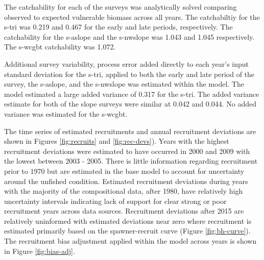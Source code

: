 \documentclass[11pt,
  english,
  a4paper,
]{article}
\begin{document}
\leavevmode\tagmcend\tagstructend\par


The catchability for each of the surveys was analytically solved comparing observed to expected vulnerable biomass across all years. The catchabiltiy for the \gls{s-tri} was 0.219 and 0.467 for the early and late periods, respectively. The catchability for the \gls{s-aslope} and the \gls{s-nwslope} was 1.043 and 1.045 respectively. The \gls{s-wcgbt} catchability was 1.072.

\leavevmode\tagmcend\tagstructend\par


Additional survey variability, process error added directly to each year's input standard deviation for the \gls{s-tri}, applied to both the early and late period of the survey, the \gls{s-aslope}, and the \gls{s-nwslope} was estimated within the model. The model estimated a large added variance of 0.317 for the \gls{s-tri}. The added variance estimate for both of the slope surveys were similar at 0.042 and 0.044. No added variance was estimated for the \gls{s-wcgbt}.

\leavevmode\tagmcend\tagstructend\par


The time series of estimated recruitments and annual recruitment deviations are shown in Figures \ref{fig:recruits} and \ref{fig:rec-devs}). Years with the highest recruitment deviations were estimated to have occurred in 2000 and 2009 with the lowest between 2003 - 2005. There is little information regarding recruitment prior to 1970 but are estimated in the base model to account for uncertainty around the unfished condition. Estimated recruitment deviations during years with the majority of the compositional data, after 1980, have relatively high uncertainty intervals indicating lack of support for clear strong or poor recruitment years across data sources. Recruitment deviations after 2015 are relatively uninformed with estimated deviations near zero where recruitment is estimated primarily based on the spawner-recruit curve (Figure \ref{fig:bh-curve}). The recruitment bias adjustment applied within the model across years is shown in Figure \ref{fig:bias-adj}.

\leavevmode\tagmcend\tagstructend\par
\end{document}
